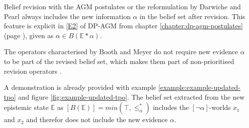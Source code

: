 \documentclass[english, 12pt]{scrartcl}
\theoremstyle{definition}
\theoremstyle{definition}
\theoremstyle{definition}
\begin{document}
Belief revision with the AGM postulates \cite{Alchourron1985} or the reformulation by Darwiche and Pearl \cite{Darwiche1997} always includes the new information $\alpha$ in the belief set after revision. This feature is explicit in \ref{E2} of DP-AGM from chapter \ref{chapter:dp-agm-postulates} (page \pageref{chapter:dp-agm-postulates}), given as $\alpha \in B(\mathbb{E}\ast\alpha)$.

The operators characterised by Booth and Meyer do not require new evidence $\alpha$ to be part of the revised belief set, which makes them part of non-prioritised revision operators \cite{Hansson1999}.

A demonstration is already provided with example \ref{example:example-updated-tpo} and figure \ref{fig:example-updated-tpo}. The belief set extracted from the new epistemic state $\mathbb{E}$ as $[B(\mathbb{E})] = min(\top, \leq_{\alpha}^{\ast})$ includes the $[\neg\alpha]$-worlds $x_{1}$ and $x_{2}$ and therefor does not include the new evidence $\alpha$.
\end{document}
